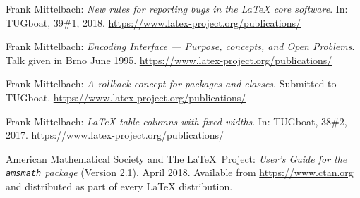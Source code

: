 \documentclass{ltnews}
\begin{document}
\begin{thebibliography}{9}

 Frank Mittelbach:
  \emph{New rules for reporting bugs in the \LaTeX{} core software}.
  In: TUGboat, 39\#1, 2018.
  \url{https://www.latex-project.org/publications/}

 Frank Mittelbach:
  \emph{\LaTeXe{} Encoding Interface --- Purpose, concepts, and
   Open Problems}.
  Talk given in Brno June 1995.
  \url{https://www.latex-project.org/publications/}

 Frank Mittelbach:
  \emph{A rollback concept for packages and classes}.
  Submitted to TUGboat.
  \url{https://www.latex-project.org/publications/}

 Frank Mittelbach:
  \emph{\LaTeX{} table columns with fixed widths}.
  In: TUGboat, 38\#2, 2017.
  \url{https://www.latex-project.org/publications/}

 American Mathematical Society and The \LaTeX\ Project:
  \emph{User's Guide for the \texttt{amsmath} package} (Version 2.1).
  April 2018.
  Available from
  \url{https://www.ctan.org}
  and distributed as part of every \LaTeX{} distribution.

\end{thebibliography}
\end{document}

